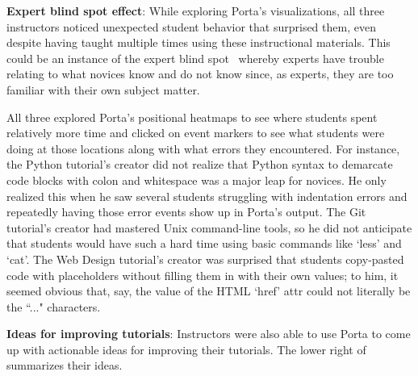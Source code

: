 
\textbf{Expert blind spot effect}: While exploring Porta's
visualizations, all three instructors noticed unexpected student
behavior that surprised them, even despite having taught multiple times
using these instructional materials.
%
This could be an instance of the expert blind spot~\cite{Nathan2001}
whereby experts have trouble relating to what novices know and do not
know since, as experts, they are too familiar with their own subject
matter.


All three explored Porta's positional heatmaps to see where students spent
relatively more time and clicked on event markers to see what students
were doing at those locations along with what errors they encountered.
%
For instance, the Python tutorial's creator did not realize that Python
syntax to demarcate code blocks with colon and whitespace was a major
leap for novices. He only realized this when he saw several students
struggling with indentation errors and repeatedly having those error
events show up in Porta's output. The Git tutorial's creator had
mastered Unix command-line tools, so he did not anticipate that students
would have such a hard time using basic commands like `less' and `cat'. The
Web Design tutorial's creator was surprised that students copy-pasted
code with placeholders without filling them in with their own values; to
him, it seemed obvious that, say, the value of the HTML `href' attr
could not literally be the ``..." characters.




\textbf{Ideas for improving tutorials}: Instructors were also
able to use Porta to come up with actionable ideas for improving their
tutorials. The lower right of  summarizes their
ideas.


